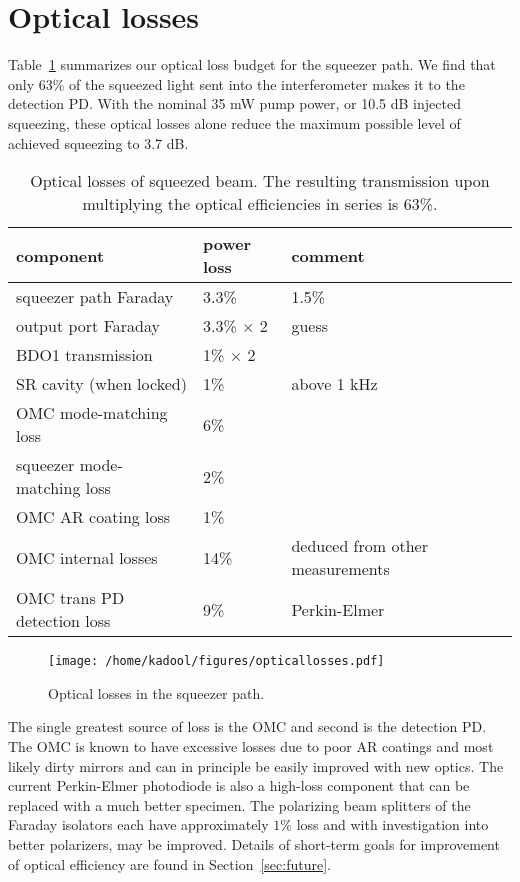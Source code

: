 \documentclass{ligodoc}
\begin{document}
\section{Optical losses}
Table~\ref{tab:losses} summarizes our optical loss budget for the
squeezer path. We find that only 63\% of the squeezed light sent into
the interferometer makes it to the detection PD. With the nominal 35 mW pump power, or 10.5 dB injected squeezing, these optical losses alone reduce the maximum possible level of achieved squeezing to 3.7 dB. 

\begin{table}
\centering
\caption{Optical losses of squeezed beam. The resulting transmission
  upon multiplying the optical efficiencies in series is 63\%.}
\begin{tabular}{l l l l} %
\hline
component & power loss & comment \\
\hline
squeezer path Faraday & 3.3\% & 1.5\% \\
output port Faraday & 3.3\% $\times$ 2 & guess \\
BDO1 transmission & 1\% $\times$ 2 & \\
SR cavity (when locked) & 1\% & above 1 kHz \\
OMC mode-matching loss & 6\% & \\
squeezer mode-matching loss & 2\% & \\
OMC AR coating loss & 1\% & \\
OMC internal losses & 14\% & deduced from other measurements \\
OMC trans PD detection loss & 9\% & Perkin-Elmer \\
\hline
\end{tabular}
\label{tab:losses}
\end{table}

\begin{figure}
\begin{centering}
\texttt{[image: /home/kadool/figures/opticallosses.pdf]}
\caption{Optical losses in the squeezer path.}
\label{fig:powerbudget}
\end{centering}
\end{figure}

The single greatest source of loss is the OMC and second is the
detection PD. The OMC is known to have excessive losses due to poor AR
coatings and most likely dirty mirrors and can in principle be easily
improved with new optics. The current Perkin-Elmer photodiode is also
a high-loss component that can be replaced with a much better
specimen. The polarizing beam splitters of the Faraday isolators each
have approximately $1\%$ loss and with investigation into better
polarizers, may be improved. Details of short-term goals for
improvement of optical efficiency are found in
Section~\ref{sec:future}.
\end{document}
